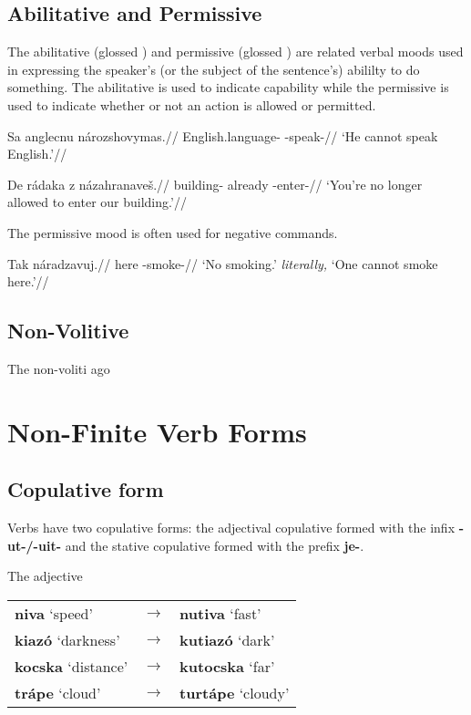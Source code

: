 \subsection{Abilitative and Permissive}
\par The abilitative (glossed ) and permissive (glossed ) are related verbal moods used in expressing the speaker's (or the subject of the sentence's) abililty to do something. The abilitative is used to indicate capability while the permissive is used to indicate whether or not an action is allowed or permitted.

\pex
\begingl
\gla Sa anglecnu nározshovymas.//
\glb {} English.language- -speak-//
\glft `He cannot speak English.'//
\endgl
\xe

\pex
\begingl
\gla De rádaka z názahranave\v{s}.//
\glb {} building- already -enter-//
\glft `You're no longer allowed to enter our building.'//
\endgl
\xe

\par The permissive mood is often used for negative commands.

\pex
\begingl
\gla Tak náradzavuj.//
\glb here -smoke-//
\glft `No smoking.' \textit{literally,} `One cannot smoke here.'//
\endgl
\xe

\subsection{Non-Volitive}
\par The non-voliti
\ex[exno={\getref{vasebroke}, rep.}]
ago
\xe
\section{Non-Finite Verb Forms}

\subsection{Copulative form}
\par Verbs have two copulative forms: the adjectival copulative formed with the infix \textbf{-ut-/-uit-} and the stative copulative formed with the prefix \textbf{je-}.
\par The adjective

\begin{table}[h!]
	\small\centering
	\begin{tabularx}{0.8\textwidth}{YMY}
		\textbf{niva} `speed' &$\rightarrow$&\textbf{nutiva} `fast'\\
		\textbf{kiazó} `darkness'&$\rightarrow$&\textbf{kutiazó} `dark'\\
		\textbf{kocska} `distance'&$\rightarrow$&\textbf{kutocska} `far'\\
		\textbf{trápe} `cloud'&$\rightarrow$&\textbf{turtápe} `cloudy'\\
	\end{tabularx}
\end{table}

